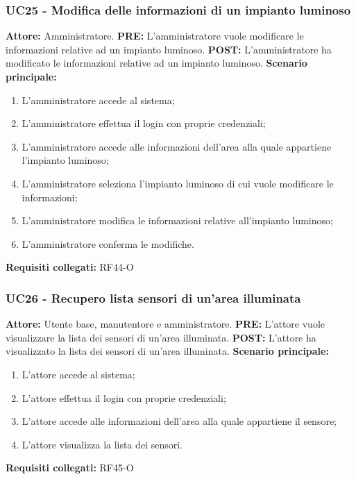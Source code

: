 \documentclass[a4paper, 12pt]{article}
\begin{document}
\subsubsection{UC25 - Modifica delle informazioni di un impianto luminoso}
\textbf{Attore: } Amministratore.\newline
\textbf{PRE: } L'amministratore vuole modificare le informazioni relative ad un impianto luminoso.\newline
\textbf{POST: } L'amministratore ha modificato le informazioni relative ad un impianto luminoso.\newline
\textbf{Scenario principale: }
\begin{enumerate}
    \item L'amministratore accede al sistema;
    \item L'amministratore effettua il login con proprie credenziali;
    \item L'amministratore accede alle informazioni dell'area alla quale appartiene l'impianto luminoso;
    \item L'amministratore seleziona l'impianto luminoso di cui vuole modificare le informazioni;
    \item L'amministratore modifica le informazioni relative all'impianto luminoso;
    \item L'amministratore conferma le modifiche.
\end{enumerate}
\textbf{Requisiti collegati: } RF44-O\newline

\subsubsection{UC26 - Recupero lista sensori di un'area illuminata}
\textbf{Attore: } Utente base, manutentore e amministratore.\newline
\textbf{PRE: } L'attore vuole visualizzare la lista dei sensori di un'area illuminata.\newline
\textbf{POST: } L'attore ha visualizzato la lista dei sensori di un'area illuminata.\newline
\textbf{Scenario principale: }
\begin{enumerate}
    \item L'attore accede al sistema;
    \item L'attore effettua il login con proprie credenziali;
    \item L'attore accede alle informazioni dell'area alla quale appartiene il sensore;
    \item L'attore visualizza la lista dei sensori.
\end{enumerate}
\textbf{Requisiti collegati: } RF45-O\newline
\end{document}
